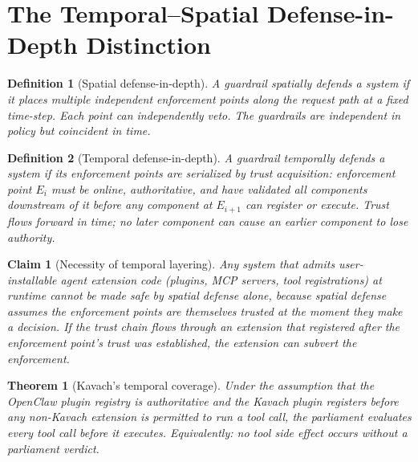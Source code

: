 \documentclass[11pt]{article}
\newtheorem{theorem}{Theorem}
\newtheorem{definition}{Definition}
\newtheorem{claim}{Claim}
\begin{document}
\section{The Temporal--Spatial Defense-in-Depth Distinction}
\label{sec:temporal-spatial}


\begin{definition}[Spatial defense-in-depth]
A guardrail \emph{spatially} defends a system if it places multiple
independent enforcement points along the request path at a fixed time-step.
Each point can independently veto. The guardrails are independent in policy
but coincident in time.
\end{definition}

\begin{definition}[Temporal defense-in-depth]
A guardrail \emph{temporally} defends a system if its enforcement points are
serialized by trust acquisition: enforcement point $E_i$ must be online,
authoritative, and have validated all components downstream of it before any
component at $E_{i+1}$ can register or execute. Trust flows forward in time;
no later component can cause an earlier component to lose authority.
\end{definition}

\begin{claim}[Necessity of temporal layering]
\label{claim:necessity}
Any system that admits user-installable agent extension code (plugins, MCP
servers, tool registrations) at runtime cannot be made safe by spatial
defense alone, because spatial defense assumes the enforcement points are
themselves trusted at the moment they make a decision. If the trust chain
flows through an extension that registered after the enforcement point's
trust was established, the extension can subvert the enforcement.
\end{claim}


\begin{theorem}[Kavach's temporal coverage]
\label{thm:coverage}
Under the assumption that the OpenClaw plugin registry is authoritative and
the Kavach plugin registers before any non-Kavach extension is permitted to
run a tool call, the parliament evaluates every tool call before it executes.
Equivalently: no tool side effect occurs without a parliament verdict.
\end{theorem}
\end{document}

